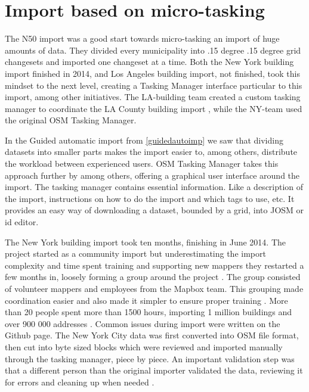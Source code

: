 \section{Import based on micro-tasking}\label{sec:importmicro}
The N50 import was a good start towards micro-tasking an import of huge amounts of data. They divided every municipality into .15 degree .15 degree grid changesets and imported one changeset at a time. Both the New York building import finished in 2014, and Los Angeles building import, not finished, took this mindset to the next level, creating a Tasking Manager interface particular to this import, among other initiatives. The LA-building team created a custom tasking manager to coordinate the LA County building import \cite{OSMTaskingManager}, while the NY-team used the original OSM Tasking Manager. 

In the Guided automatic import from \ref{guidedautoimp} we saw that dividing datasets into smaller parts makes the import easier to, among others, distribute the workload between experienced users. OSM Tasking Manager takes this approach further by among others, offering a graphical user interface around the import. The tasking manager contains essential information. Like a description of the import, instructions on how to do the import and which tags to use, etc. It provides an easy way of downloading a dataset, bounded by a grid, into JOSM or id editor.

The New York building import took ten months, finishing in June 2014. The project started as a community import but underestimating the import complexity and time spent training and supporting new mappers they restarted a few months in, loosely forming a group around the project \cite{Barth2014}. The group consisted of volunteer mappers and employees from the Mapbox team. This grouping made coordination easier and also made it simpler to ensure proper training \cite{Barth2014a}. More than 20 people spent more than 1500 hours, importing 1 million buildings and over 900 000 addresses \cite{Barth2014}. Common issues during import were written on the Github page. The New York City data was first converted into OSM file format, then cut into byte sized blocks which were reviewed and imported manually through the tasking manager, piece by piece. An important validation step was that a different person than the original importer validated the data, reviewing it for errors and cleaning up when needed \cite{Barth2014}. 

